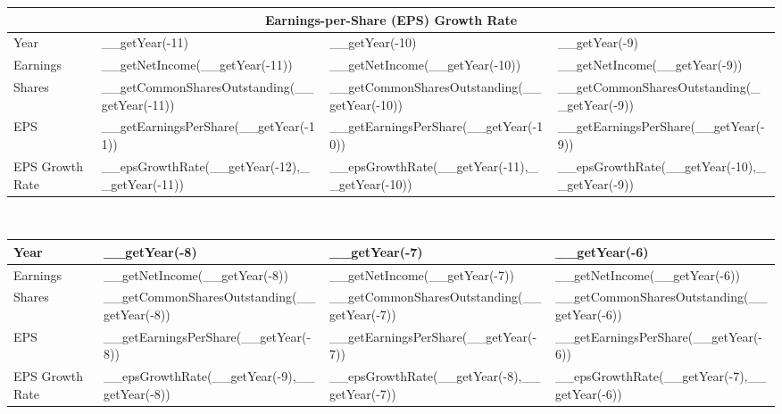 \begin{tabularx}{\textwidth}{|X|X|X|X|}
 \hline
 \multicolumn{4}{|c|}{Earnings-per-Share (EPS) Growth Rate} \\
 \hline
 Year                                 & __getYear(-11)                                 & __getYear(-10)                                 & __getYear(-9)                                 \\
 \hline
 Earnings                             & __getNetIncome(__getYear(-11))                 & __getNetIncome(__getYear(-10))                 & __getNetIncome(__getYear(-9))                 \\
 Shares                               & __getCommonSharesOutstanding(__getYear(-11))   & __getCommonSharesOutstanding(__getYear(-10))   & __getCommonSharesOutstanding(__getYear(-9))   \\
 EPS                                  & __getEarningsPerShare(__getYear(-11))          & __getEarningsPerShare(__getYear(-10))          & __getEarningsPerShare(__getYear(-9))          \\
 \rowcolor{lightgray} EPS Growth Rate & __epsGrowthRate(__getYear(-12),__getYear(-11)) & __epsGrowthRate(__getYear(-11),__getYear(-10)) & __epsGrowthRate(__getYear(-10),__getYear(-9)) \\
 \hline
\end{tabularx}\\

\begin{tabularx}{\textwidth}{|X|X|X|X|}
 \hline
 Year                                 & __getYear(-8)                                 & __getYear(-7)                                 & __getYear(-6)                                 \\
 \hline
 Earnings                             & __getNetIncome(__getYear(-8))                 & __getNetIncome(__getYear(-7))                 & __getNetIncome(__getYear(-6))                 \\
 Shares                               & __getCommonSharesOutstanding(__getYear(-8))   & __getCommonSharesOutstanding(__getYear(-7))   & __getCommonSharesOutstanding(__getYear(-6))   \\
 EPS                                  & __getEarningsPerShare(__getYear(-8))          & __getEarningsPerShare(__getYear(-7))          & __getEarningsPerShare(__getYear(-6))          \\
 \rowcolor{lightgray} EPS Growth Rate & __epsGrowthRate(__getYear(-9),__getYear(-8))  & __epsGrowthRate(__getYear(-8),__getYear(-7))  & __epsGrowthRate(__getYear(-7),__getYear(-6))  \\
 \hline
\end{tabularx}\\

